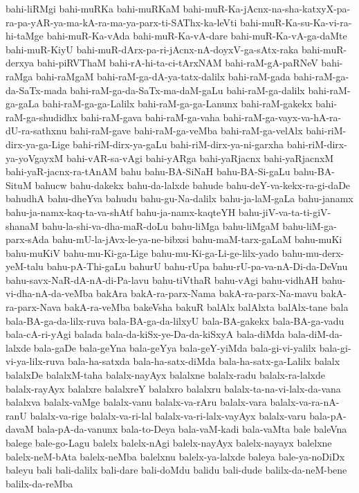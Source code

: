 {bahi-liRMgi
bahi-muRKa
bahi-muRKaM
bahi-muR-Ka-jAcnx-na-sha-katxyX-pa-ra-pa-yAR-ya-ma-kA-ra-ma-ya-parx-ti-SAThx-ka-leVti
bahi-muR-Ka-su-Ka-vi-ra-hi-taMge
bahi-muR-Ka-vAda
bahi-muR-Ka-vA-dare
bahi-muR-Ka-vA-ga-daMte
bahi-muR-KiyU
bahi-muR-dArx-pa-ri-jAcnx-nA-doyxV-ga-sAtx-raka
bahi-muR-derxya
bahi-piRVThaM
bahi-rA-hi-ta-ci-tArxNAM
bahi-raM-gA-paRNeV
bahi-raMga
bahi-raMgaM
bahi-raM-ga-dA-ya-tatx-dalilx
bahi-raM-gada
bahi-raM-ga-da-SaTx-mada
bahi-raM-ga-da-SaTx-ma-daM-gaLu
bahi-raM-ga-dalilx
bahi-raM-ga-gaLa
bahi-raM-ga-ga-Lalilx
bahi-raM-ga-ga-Lanunx
bahi-raM-gakekx
bahi-raM-ga-shudidhx
bahi-raM-gava
bahi-raM-ga-vaha
bahi-raM-ga-vayx-va-hA-ra-dU-ra-sathxnu
bahi-raM-gave
bahi-raM-ga-veMba
bahi-raM-ga-velAlx
bahi-riM-dirx-ya-ga-Lige
bahi-riM-dirx-ya-gaLu
bahi-riM-dirx-ya-ni-garxha
bahi-riM-dirx-ya-yoVgayxM
bahi-vAR-sa-vAgi
bahi-yARga
bahi-yaRjacnx
bahi-yaRjacnxM
bahi-yaR-jacnx-ra-tAnAM
bahu
bahu-BA-SiNaH
bahu-BA-Si-gaLu
bahu-BA-SituM
bahucw
bahu-dakekx
bahu-da-lalxde
bahude
bahu-deY-va-kekx-ra-gi-daDe
bahudhA
bahu-dheYva
bahudu
bahu-gu-Na-dalilx
bahu-ja-laM-gaLa
bahu-janamx
bahu-ja-namx-kaq-ta-va-shAtf
bahu-ja-namx-kaqteYH
bahu-jiV-va-ta-ti-giV-shanaM
bahu-la-shi-va-dha-maR-doLu
bahu-liMga
bahu-liMgaM
bahu-liM-ga-parx-sAda
bahu-mU-la-jAvx-le-ya-ne-bibxsi
bahu-maM-tarx-gaLaM
bahu-muKi
bahu-muKiV
bahu-mu-Ki-ga-Lige
bahu-mu-Ki-ga-Li-ge-lilx-yado
bahu-mu-derx-yeM-talu
bahu-pA-Thi-gaLu
bahurU
bahu-rUpa
bahu-rU-pa-va-nA-Di-da-DeVnu
bahu-savx-NaR-dA-nA-di-Pa-lavu
bahu-tiVthaR
bahu-vAgi
bahu-vidhAH
bahu-vi-dha-nA-da-veMba
bakAra
bakA-ra-parx-Nama
bakA-ra-parx-Na-mavu
bakA-ra-parx-Nava
bakA-ra-veMba
bakeVsha
bakuR
balAlx
balAlxta
balAlx-tane
bala
bala-BA-ga-da-lilx-ruva
bala-BA-ga-da-lilxyU
bala-BA-gakekx
bala-BA-ga-vadu
bala-cA-ri-yAgi
balada
bala-da-kiSx-ye-Da-da-kiSxyA
bala-diMda
bala-diM-da-lalxde
bala-gaDe
bala-geYna
bala-geYya
bala-geY-yiMda
bala-gi-vi-yalilx
bala-gi-vi-ya-lilx-ruva
bala-ha-satxda
bala-ha-satx-diMda
bala-ha-satx-ga-Lalilx
balalx
balalxDe
balalxM-taha
balalx-nayAyx
balalxne
balalx-radu
balalx-ra-lalxde
balalx-rayAyx
balalxre
balalxreY
balalxro
balalxru
balalx-ta-na-vi-lalx-da-vana
balalxva
balalx-vaMge
balalx-vanu
balalx-va-rAru
balalx-vara
balalx-va-ra-nA-ranU
balalx-va-rige
balalx-va-ri-lal
balalx-va-ri-lalx-vayAyx
balalx-varu
bala-pA-davaM
bala-pA-da-vanunx
bala-to-Deya
bala-vaM-kadi
bala-vaMta
bale
baleVna
balege
bale-go-Lagu
balelx
balelx-nAgi
balelx-nayAyx
balelx-nayayx
balelxne
balelx-neM-bAta
balelx-neMba
balelxnu
balelx-ya-lalxde
baleya
bale-ya-noDiDx
baleyu
bali
bali-dalilx
bali-dare
bali-doMdu
balidu
bali-dude
balilx-da-neM-bene
balilx-da-reMba
}
